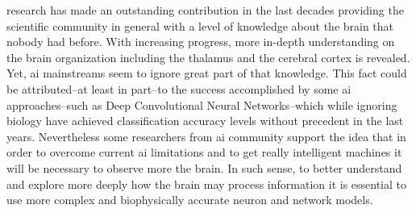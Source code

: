 \documentclass[10pt,journal,compsoc]{IEEEtran}
\begin{document}




% 
% 
% 
% 

 

 research has made an outstanding contribution in the last decades providing the scientific community in general with a level of knowledge about the brain that nobody had before. With increasing progress, more in-depth understanding on the brain organization including the thalamus and the cerebral cortex is revealed. Yet, \gls{ai} mainstreams seem to ignore great part of that knowledge. This fact could be attributed--at least in part--to the success accomplished by some \gls{ai} approaches–such as Deep Convolutional Neural Networks–which while ignoring biology have achieved classification accuracy levels without precedent in the last years. Nevertheless some researchers from \gls{ai} community support the idea that in order to overcome current \gls{ai} limitations and to get really intelligent machines it will be necessary to observe more the brain. In such sense, to better understand and explore more deeply how the brain may process information it is essential to use more complex and biophysically accurate neuron and network models.
\end{document}
